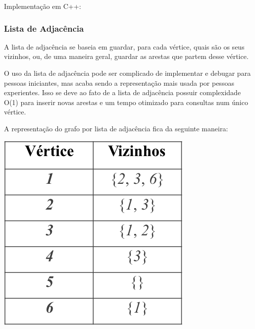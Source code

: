 \documentclass[a4paper,12pt]{article}
\begin{document}
\indent Implementação em C++:


\subsubsection{Lista de Adjacência}

\indent\indent A lista de adjacência se baseia em guardar, para cada vértice, quais são os seus vizinhos, ou, de uma maneira geral, guardar as arestas que partem desse vértice.

\indent O uso da lista de adjacência pode ser complicado de implementar e debugar para pessoas iniciantes, mas acaba sendo a representação mais usada por pessoas experientes. Isso se deve ao fato de a lista de adjacência possuir complexidade O(1) para inserir novas arestas e um tempo otimizado para consultas num único vértice.

\indent A representação do grafo por lista de adjacência fica da seguinte maneira:

\begin{center}
  \includegraphics[width=\linewidth/2]{figures/grafos/representacao_lista_adj.png}
\end{center}
\end{document}
